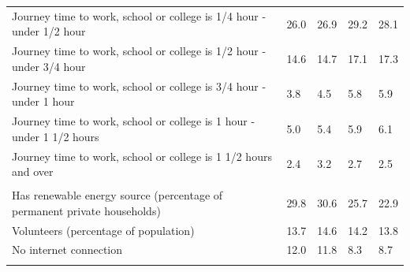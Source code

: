 \documentclass{article}
\begin{document}
\begin{table}[h]
\begin{tabular}{KTTTT}
Journey time to work, school or college is 1/4 hour - under 1/2 hour & 26.0& 26.9& 29.2& 28.1\\
Journey time to work, school or college is 1/2 hour - under 3/4 hour & 14.6& 14.7& 17.1& 17.3\\
Journey time to work, school or college is 3/4 hour - under 1 hour & 3.8& 4.5& 5.8& 5.9\\
Journey time to work, school or college is 1 hour - under 1 1/2 hours & 5.0& 5.4& 5.9& 6.1\\
Journey time to work, school or college is 1 1/2 hours and over & 2.4& 3.2& 2.7& 2.5\\
\hline
    \\ 
    \hline
Has renewable energy source (percentage of permanent private households) & 29.8& 30.6& 25.7& 22.9\\
    \hline
Volunteers (percentage of population) & 13.7& 14.6& 14.2& 13.8\\
    \hline
No internet connection& 12.0& 11.8&  8.3&  8.7\\
\hline
\end{tabular}
\end{table}
\end{document}
